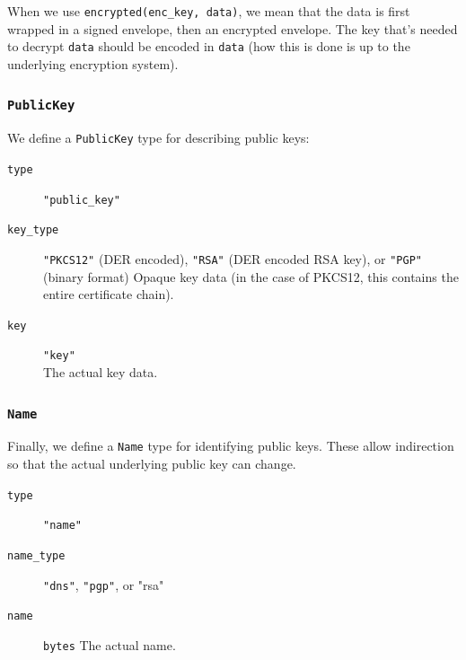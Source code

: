 \documentclass[pdftex,12pt,a4papaer,twoside,notitlepage]{report}
\begin{document}
\begin{appendices}
When we use \verb=encrypted(enc_key, data)=, we mean that the data is first
wrapped in a signed envelope, then an encrypted envelope. The key that's needed
to decrypt \texttt{data} should be encoded in \texttt{data} (how this is done is
up to the underlying encryption system).

\subsubsection{\texttt{PublicKey}}

We define a \texttt{PublicKey} type for describing public keys:

\begin{leftbar}
\begin{description}
\item[\texttt{type}] \verb="public_key"=
\item[\texttt{key\_type}] \verb="PKCS12"= (DER encoded), \verb="RSA"= (DER
  encoded RSA key), or \verb="PGP"= (binary format) Opaque key data (in the case
  of PKCS12, this contains the entire certificate chain).
\item[\texttt{key}] \verb="key"= \\
  The actual key data.
\end{description}
\end{leftbar}

\subsubsection{\texttt{Name}}

Finally, we define a \texttt{Name} type for identifying public keys. These allow
indirection so that the actual underlying public key can change.

\begin{leftbar}
\begin{description}
  \item[\texttt{type}] \verb="name"=
  \item[\texttt{name\_type}] \verb="dns"=, \verb="pgp"=, or "rsa"
  \item[\texttt{name}] \texttt{bytes}
    The actual name.
\end{description}
\end{leftbar}


\end{appendices}
\end{document}
